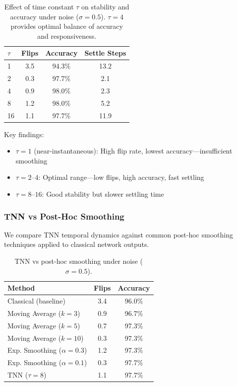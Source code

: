 \documentclass[11pt]{article}
\begin{document}
\begin{table}[h]
\centering
\begin{tabular}{lccc}
\toprule
$\tau$ & Flips & Accuracy & Settle Steps \\
\midrule
1 & 3.5 & 94.3\% & 13.2 \\
2 & 0.3 & 97.7\% & 2.1 \\
4 & 0.9 & 98.0\% & 2.3 \\
8 & 1.2 & 98.0\% & 5.2 \\
16 & 1.1 & 97.7\% & 11.9 \\
\bottomrule
\end{tabular}
\caption{Effect of time constant $\tau$ on stability and accuracy under noise ($\sigma=0.5$). $\tau=4$ provides optimal balance of accuracy and responsiveness.}
\label{tab:tau_ablation}
\end{table}

Key findings:
\begin{itemize}
    \item $\tau = 1$ (near-instantaneous): High flip rate, lowest accuracy---insufficient smoothing
    \item $\tau = 2$--$4$: Optimal range---low flips, high accuracy, fast settling
    \item $\tau = 8$--$16$: Good stability but slower settling time
\end{itemize}

\subsubsection{TNN vs Post-Hoc Smoothing}

We compare TNN temporal dynamics against common post-hoc smoothing techniques applied to classical network outputs.

\begin{table}[h]
\centering
\begin{tabular}{lcc}
\toprule
Method & Flips & Accuracy \\
\midrule
Classical (baseline) & 3.4 & 96.0\% \\
\midrule
Moving Average ($k=3$) & 0.9 & 96.7\% \\
Moving Average ($k=5$) & 0.7 & 97.3\% \\
Moving Average ($k=10$) & 0.3 & 97.3\% \\
Exp. Smoothing ($\alpha=0.3$) & 1.2 & 97.3\% \\
Exp. Smoothing ($\alpha=0.1$) & 0.3 & 97.7\% \\
\midrule
TNN ($\tau=8$) & 1.1 & 97.7\% \\
\bottomrule
\end{tabular}
\caption{TNN vs post-hoc smoothing under noise ($\sigma=0.5$).}
\label{tab:smoothing}
\end{table}
\end{document}
